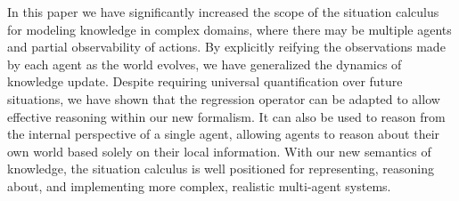 \documentclass{ifaamas-submission}
\begin{document}
\label{sec:Conclusions}In this paper we have significantly increased
the scope of the situation calculus for modeling knowledge in complex
domains, where there may be multiple agents and partial observability
of actions. By explicitly reifying the observations made by each agent
as the world evolves, we have generalized the dynamics of knowledge
update. Despite requiring
universal quantification over future situations, we have shown that
the regression operator can be adapted to allow effective reasoning
within our new formalism. It can also be used to reason from the internal
perspective of a single agent, allowing agents to reason about their
own world based solely on their local information.
With our new semantics of knowledge, the situation calculus is well
positioned for representing, reasoning about, and implementing more
complex, realistic multi-agent systems.



\end{document}
